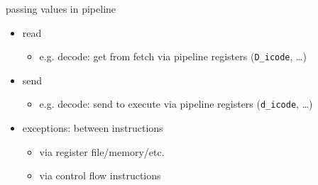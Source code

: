 \begin{frame}{passing values in pipeline}
    \begin{itemize}
        \item read 
            \begin{itemize}
            \item e.g. decode: get from fetch via pipeline registers ({\tt D\_icode}, \ldots)
            \end{itemize}
        \item send 
            \begin{itemize}
            \item e.g. decode: send to execute via pipeline registers ({\tt d\_icode}, \ldots)
            \end{itemize}
        \vspace{.5cm}
        \item exceptions:  between instructions
        \begin{itemize}
            \item via register file/memory/etc.
            \item via control flow instructions
        \end{itemize}
    \end{itemize}
\end{frame}

